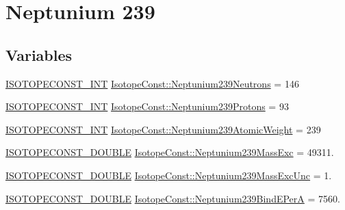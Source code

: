 \hypertarget{group___isotope_const-_neptunium-_np239}{}\section{Neptunium 239}
\label{group___isotope_const-_neptunium-_np239}
\subsection*{Variables}
\begin{DoxyCompactItemize}
\item 
\mbox{\hyperlink{group___isotope_const-_macros_ga5f18360b3e99483a35c32d789e62621c}{I\+S\+O\+T\+O\+P\+E\+C\+O\+N\+S\+T\+\_\+\+I\+NT}} \mbox{\hyperlink{group___isotope_const-_neptunium-_np239_gae1f256d7f2b34f636db1350f06a93bb5}{Isotope\+Const\+::\+Neptunium239\+Neutrons}} = 146
\item 
\mbox{\hyperlink{group___isotope_const-_macros_ga5f18360b3e99483a35c32d789e62621c}{I\+S\+O\+T\+O\+P\+E\+C\+O\+N\+S\+T\+\_\+\+I\+NT}} \mbox{\hyperlink{group___isotope_const-_neptunium-_np239_ga95e4abbe3ba5a8de8c46b5e04cc00386}{Isotope\+Const\+::\+Neptunium239\+Protons}} = 93
\item 
\mbox{\hyperlink{group___isotope_const-_macros_ga5f18360b3e99483a35c32d789e62621c}{I\+S\+O\+T\+O\+P\+E\+C\+O\+N\+S\+T\+\_\+\+I\+NT}} \mbox{\hyperlink{group___isotope_const-_neptunium-_np239_ga11e57ef5dda6d0c4e32ed56dcee7e2e3}{Isotope\+Const\+::\+Neptunium239\+Atomic\+Weight}} = 239
\item 
\mbox{\hyperlink{group___isotope_const-_macros_ga8f45a7272ce02c0b4c65c44636ed719a}{I\+S\+O\+T\+O\+P\+E\+C\+O\+N\+S\+T\+\_\+\+D\+O\+U\+B\+LE}} \mbox{\hyperlink{group___isotope_const-_neptunium-_np239_ga5187c7d4d5769033c62feed1f58849a5}{Isotope\+Const\+::\+Neptunium239\+Mass\+Exc}} = 49311.
\item 
\mbox{\hyperlink{group___isotope_const-_macros_ga8f45a7272ce02c0b4c65c44636ed719a}{I\+S\+O\+T\+O\+P\+E\+C\+O\+N\+S\+T\+\_\+\+D\+O\+U\+B\+LE}} \mbox{\hyperlink{group___isotope_const-_neptunium-_np239_ga5ea6f0156084e6190da31bb720d35db9}{Isotope\+Const\+::\+Neptunium239\+Mass\+Exc\+Unc}} = 1.
\item 
\mbox{\hyperlink{group___isotope_const-_macros_ga8f45a7272ce02c0b4c65c44636ed719a}{I\+S\+O\+T\+O\+P\+E\+C\+O\+N\+S\+T\+\_\+\+D\+O\+U\+B\+LE}} \mbox{\hyperlink{group___isotope_const-_neptunium-_np239_gae63ad7e9d05ab0d875a1e648bebaa583}{Isotope\+Const\+::\+Neptunium239\+Bind\+E\+PerA}} = 7560.
\item 

\end{DoxyCompactItemize}
